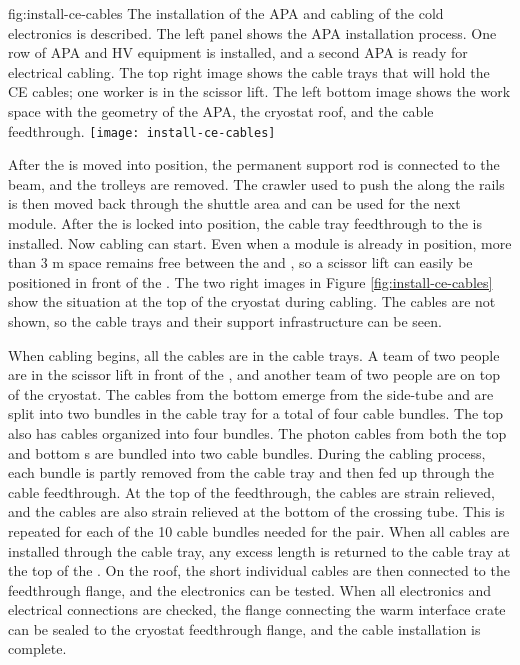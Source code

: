 \begin{dunefigure}{fig:install-ce-cables}
  {The installation of the APA and cabling of the cold electronics is described. The left panel shows the APA installation process. One row of APA and HV equipment is installed, and a second APA is ready for electrical cabling. The top right image shows the cable trays that will hold the CE cables; one worker is in the scissor lift. The left bottom image shows the work space with the geometry of the APA, the cryostat roof, and the cable feedthrough.}
\texttt{[image: install-ce-cables]}
\end{dunefigure}

After the  is moved into position, the permanent support rod is connected to the  beam, and the trolleys are removed. 
The crawler used to push the  along the rails is then moved back through the shuttle area and can be used for the next module. 
After the  is locked into position, the cable tray feedthrough to the  is installed. Now  cabling can start. 
Even when a  module is already in position, more than 3 \si{m} space remains free between the  and , so a scissor lift can easily be positioned in front of the . 
The two right images in Figure \ref{fig:install-ce-cables} show the situation at the top of the cryostat during cabling. The cables are not shown, so the cable trays and their support infrastructure can be seen. 

When cabling begins, all the cables are in the cable trays. 
A team of two people are in the scissor lift in front of the , and another team of two people are on top of the cryostat. 
The  cables from the bottom  emerge from the  side-tube and are split into two bundles in the cable tray for a total of four cable bundles. 
The top  also has  cables organized into four bundles. 
The photon cables from both the top and bottom s are bundled into two cable bundles.
During the cabling process, each bundle is partly removed from the cable tray and then fed up through the cable feedthrough. 
At the top of the feedthrough, the cables are strain relieved, and the cables are also strain relieved at the bottom of the crossing tube.
This is repeated for each of the 10 cable bundles needed for the  pair. 
When all cables are installed through the cable tray, any excess length is returned to the cable tray at the top of the . 
On the roof, the short individual cables are then connected to the feedthrough flange, and the electronics can be tested. When all electronics and electrical connections are checked, the flange connecting the warm interface crate can be sealed to the cryostat feedthrough flange, and the cable installation is complete. 

